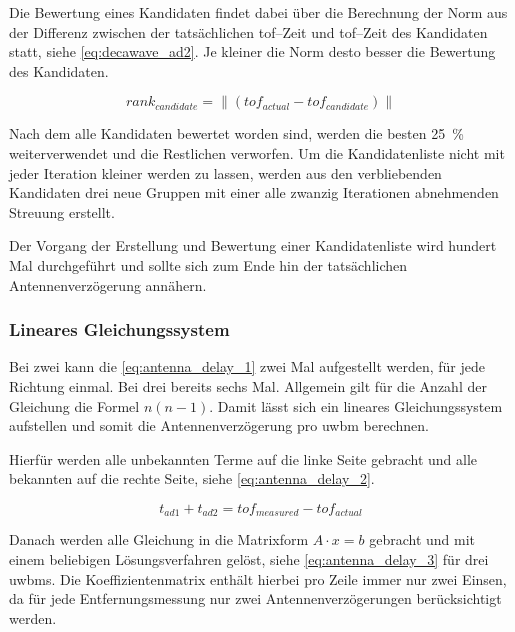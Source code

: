 Die Bewertung eines Kandidaten findet dabei über die Berechnung der Norm aus der Differenz zwischen der tatsächlichen \Gls{tof}--Zeit und \Gls{tof}--Zeit des Kandidaten statt, siehe \autoref{eq:decawave_ad2}. Je kleiner die Norm desto besser die Bewertung des Kandidaten.

\begin{equation}
rank_{candidate}=\lVert (tof_{actual} - tof_{candidate}) \lVert\label{eq:decawave_ad2}
\end{equation}

Nach dem alle Kandidaten bewertet worden sind, werden die besten \SI{25}{\percent} weiterverwendet und die Restlichen verworfen. Um die Kandidatenliste nicht mit jeder Iteration kleiner werden zu lassen, werden aus den verbliebenden Kandidaten drei neue Gruppen mit einer alle zwanzig Iterationen abnehmenden Streuung erstellt.

Der Vorgang der Erstellung und Bewertung einer Kandidatenliste wird hundert Mal durchgeführt und sollte sich zum Ende hin der tatsächlichen Antennenverzögerung annähern.


\begin{comment}
--------------------------------------------------------------------------------
\end{comment}
\subsubsection{Lineares Gleichungssystem}

Bei zwei  kann die \autoref{eq:antenna_delay_1} zwei Mal aufgestellt werden, für jede Richtung einmal. Bei drei  bereits sechs Mal. Allgemein gilt für die Anzahl der Gleichung die Formel $n(n-1)$. Damit lässt sich ein lineares Gleichungssystem aufstellen und somit die Antennenverzögerung pro \Gls{uwbm} berechnen.

Hierfür werden alle unbekannten Terme auf die linke Seite gebracht und alle bekannten auf die rechte Seite, siehe \autoref{eq:antenna_delay_2}.

\begin{equation}
t_{ad1} + t_{ad2} = tof_{measured} - tof_{actual} \label{eq:antenna_delay_2}
\end{equation}

Danach werden alle Gleichung in die Matrixform $A\cdot x=b$ gebracht und mit einem beliebigen Lösungsverfahren gelöst, siehe \autoref{eq:antenna_delay_3} für drei \Glspl{uwbm}. Die Koeffizientenmatrix enthält hierbei pro Zeile immer nur zwei Einsen, da für jede Entfernungsmessung nur zwei Antennenverzögerungen berücksichtigt werden.

